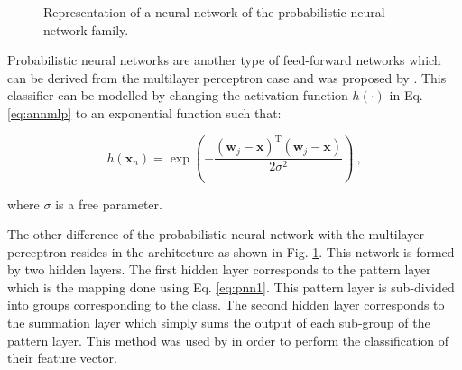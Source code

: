 \begin{enumerate}[leftmargin=*]
\begin{figure}
\caption{Representation of a neural network of the probabilistic neural network family.}
\label{fig:pnn}
\end{figure}

Probabilistic neural networks are another type of feed-forward networks which can be derived from the multilayer perceptron case and was proposed by \cite{Specht1988}. This classifier can be modelled by changing the activation function $h(\cdot)$ in Eq. \eqref{eq:annmlp} to an exponential function such that:

\begin{equation}
	h(\mathbf{x}_n) = \exp \left( - \frac{ (\mathbf{w}_j - \mathbf{x})^{\text{T}}(\mathbf{w}_j - \mathbf{x}) }{2\sigma^2} \right) \ ,
	\label{eq:pnn1}
\end{equation}

\noindent where $\sigma$ is a free parameter.

The other difference of the probabilistic neural network with the multilayer perceptron resides in the architecture as shown in Fig. \ref{fig:pnn}. This network is formed by two hidden layers. The first hidden layer corresponds to the pattern layer which is the mapping done using Eq. \eqref{eq:pnn1}. This pattern layer is sub-divided into groups corresponding to the class. The second hidden layer corresponds to the summation layer which simply sums the output of each sub-group of the pattern layer. This method was used  by \cite{Ampeliotis2007,Ampeliotis2008,Viswanath2011} in order to perform the classification of their feature vector.


\end{enumerate}
